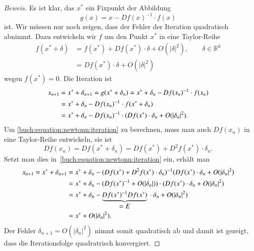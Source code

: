 \begin{proof}[Beweis]
Es ist klar, das $x^*$ ein Fixpunkt der Abbildung
\[
g(x)=x-Df(x)^{-1}\cdot f(x)
\]
ist.
Wir müssen nur noch zeigen, dass der Fehler der Iteration quadratisch
abnimmt.
Dazu entwickeln wir $f$ um den Punkt $x^*$ in eine Taylor-Reihe
\begin{align*}
f(x^* + \delta)
&=
f(x^*) + Df(x^*)\cdot \delta + O(|\delta|^2),\qquad\delta\in\mathbb R^k
\\
&=
Df(x^*)\cdot \delta + O(|\delta|^2)
\end{align*}
wegen $f(x^*)=0$.
Die Iteration ist
\begin{align}
x_{n+1}
&=
x^* +\delta_{n+1}
=
g(x^*+\delta_n)
=
x^*+\delta_n  - Df(x_n)^{-1}\cdot f(x_n)
\notag
\\
&=
x^* + \delta_n -Df(x_n)^{-1}\cdot f(x^* + \delta_n)
\notag
\\
&=
x^* + \delta_n -Df(x_n)^{-1}\cdot
(Df(x^*)\cdot \delta_n + O(|\delta_n|^2).
\label{buch:equation:newtonn:iteration}
\end{align}
Um \eqref{buch:equation:newtonn:iteration}
zu berechnen, muss man auch $Df(x_n)$ in eine Taylor-Reihe entwickeln, sie ist
\[
Df(x_n)
=
Df(x^*+\delta_n)
=
Df(x^*) + D^2f(x^*)\cdot\delta_n.
\]
Setzt man dies in~\eqref{buch:equation:newtonn:iteration} ein, erhält man
\begin{align*}
x_{n+1}
=
x^*+\delta_{n+1}
&=
x^* + \delta_n -
(Df(x^*) + D^2f(x^*)\cdot\delta_n)^{-1}
(Df(x^*)\cdot \delta_n + O(|\delta_n|^2)
\\
&=
x^* + \delta_n -
(Df(x^*)^{-1} + O(|\delta_n|))
\cdot
(Df(x^*)\cdot \delta_n + O(|\delta_n|^2)
\\
&=
x^* + \delta_n
- \underbrace{Df(x^*)^{-1}Df(x^*)}_{\displaystyle = E}\mathstrut\cdot\delta_n
+
O(|\delta_n|^2)
\\
&=x^* + O(|\delta_n|^2).
\end{align*}
Der Fehler $\delta_{n+1}=O(|\delta_n|^2)$ nimmt somit quadratisch ab
und damit ist gezeigt, dass die Iterationsfolge quadratrisch
konvergiert.
\end{proof}

